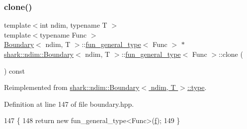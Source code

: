 \subsubsection{\texorpdfstring{clone()}{clone()}}
{\footnotesize\ttfamily template$<$int ndim, typename T $>$ \\
template$<$typename Func $>$ \\
\hyperlink{classshark_1_1ndim_1_1_boundary}{Boundary}$<$ ndim, T $>$\+::\hyperlink{classshark_1_1ndim_1_1_boundary_1_1fun__general__type}{fun\+\_\+general\+\_\+type}$<$ Func $>$ $\ast$ \hyperlink{classshark_1_1ndim_1_1_boundary}{shark\+::ndim\+::\+Boundary}$<$ ndim, T $>$\+::\hyperlink{classshark_1_1ndim_1_1_boundary_1_1fun__general__type}{fun\+\_\+general\+\_\+type}$<$ Func $>$\+::clone (\begin{DoxyParamCaption}{ }\end{DoxyParamCaption}) const\hspace{0.3cm}{\ttfamily [virtual]}}



Reimplemented from \hyperlink{classshark_1_1ndim_1_1_boundary_1_1type_a5651988ce3a6c229009d3fa849e820dc}{shark\+::ndim\+::\+Boundary$<$ ndim, T $>$\+::type}.



Definition at line 147 of file boundary.\+hpp.


\begin{DoxyCode}
147                                                                                                     \{
148             \textcolor{keywordflow}{return} \textcolor{keyword}{new} fun\_general\_type<Func>(\hyperlink{classshark_1_1ndim_1_1_boundary_1_1fun__general__type_a7a2449e92b694dd4d966e17c4d999a91}{f});
149         \}
\end{DoxyCode}
\hypertarget{classshark_1_1ndim_1_1_boundary_1_1fun__general__type_a7f5d89a026065de5a42b757ce507a70f}{}\label{classshark_1_1ndim_1_1_boundary_1_1fun__general__type_a7f5d89a026065de5a42b757ce507a70f} 
